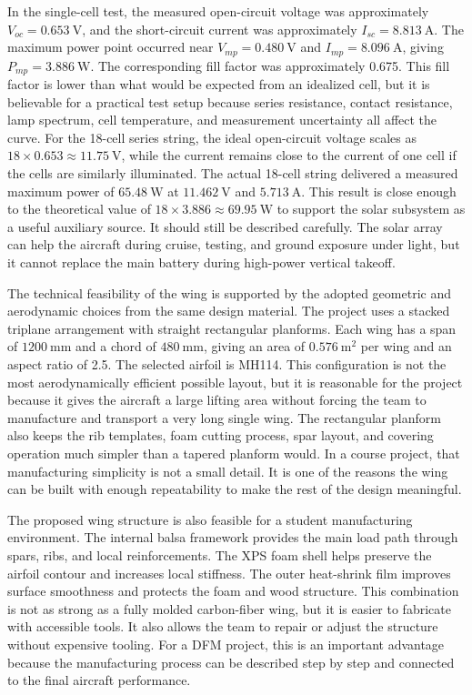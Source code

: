In the single-cell test, the measured open-circuit voltage was approximately \(V_{oc}=0.653~\mathrm{V}\), and the short-circuit current was approximately \(I_{sc}=8.813~\mathrm{A}\). The maximum power point occurred near \(V_{mp}=0.480~\mathrm{V}\) and \(I_{mp}=8.096~\mathrm{A}\), giving \(P_{mp}=3.886~\mathrm{W}\). The corresponding fill factor was approximately 0.675. This fill factor is lower than what would be expected from an idealized cell, but it is believable for a practical test setup because series resistance, contact resistance, lamp spectrum, cell temperature, and measurement uncertainty all affect the curve. For the 18-cell series string, the ideal open-circuit voltage scales as \(18 \times 0.653 \approx 11.75~\mathrm{V}\), while the current remains close to the current of one cell if the cells are similarly illuminated. The actual 18-cell string delivered a measured maximum power of \(65.48~\mathrm{W}\) at \(11.462~\mathrm{V}\) and \(5.713~\mathrm{A}\). This result is close enough to the theoretical value of \(18 \times 3.886 \approx 69.95~\mathrm{W}\) to support the solar subsystem as a useful auxiliary source. It should still be described carefully. The solar array can help the aircraft during cruise, testing, and ground exposure under light, but it cannot replace the main battery during high-power vertical takeoff.

The technical feasibility of the wing is supported by the adopted geometric and aerodynamic choices from the same design material. The project uses a stacked triplane arrangement with straight rectangular planforms. Each wing has a span of \(1200~\mathrm{mm}\) and a chord of \(480~\mathrm{mm}\), giving an area of \(0.576~\mathrm{m^2}\) per wing and an aspect ratio of 2.5. The selected airfoil is MH114. This configuration is not the most aerodynamically efficient possible layout, but it is reasonable for the project because it gives the aircraft a large lifting area without forcing the team to manufacture and transport a very long single wing. The rectangular planform also keeps the rib templates, foam cutting process, spar layout, and covering operation much simpler than a tapered planform would. In a course project, that manufacturing simplicity is not a small detail. It is one of the reasons the wing can be built with enough repeatability to make the rest of the design meaningful.

The proposed wing structure is also feasible for a student manufacturing environment. The internal balsa framework provides the main load path through spars, ribs, and local reinforcements. The XPS foam shell helps preserve the airfoil contour and increases local stiffness. The outer heat-shrink film improves surface smoothness and protects the foam and wood structure. This combination is not as strong as a fully molded carbon-fiber wing, but it is easier to fabricate with accessible tools. It also allows the team to repair or adjust the structure without expensive tooling. For a DFM project, this is an important advantage because the manufacturing process can be described step by step and connected to the final aircraft performance.

